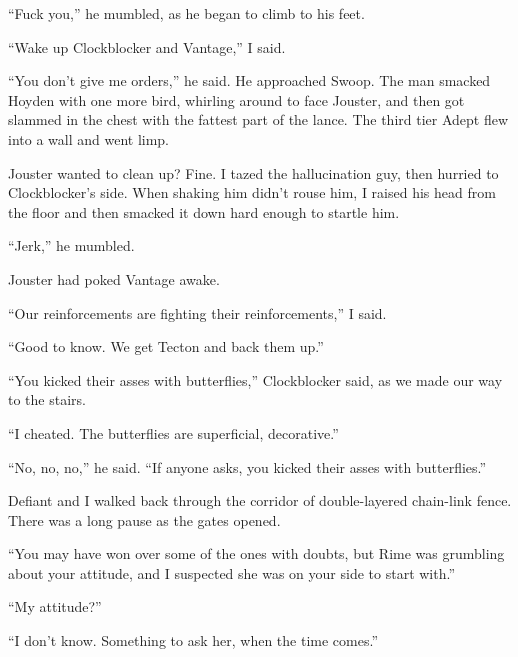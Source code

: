 ``Fuck you,'' he mumbled, as he began to climb to his feet.



``Wake up Clockblocker and Vantage,'' I said.



``You don't give me orders,'' he said.  He approached Swoop.  The man smacked Hoyden with one more bird, whirling around to face Jouster, and then got slammed in the chest with the fattest part of the lance.  The third tier Adept flew into a wall and went limp.



Jouster wanted to clean up?  Fine.  I tazed the hallucination guy, then hurried to Clockblocker's side.  When shaking him didn't rouse him, I raised his head from the floor and then smacked it down hard enough to startle him.



``Jerk,'' he mumbled.



Jouster had poked Vantage awake.



``Our reinforcements are fighting their reinforcements,'' I said.



``Good to know.  We get Tecton and back them up.''



``You kicked their asses with butterflies,'' Clockblocker said, as we made our way to the stairs.



``I cheated.  The butterflies are superficial, decorative.''



``No, no, no,'' he said.  ``If anyone asks, you kicked their asses with butterflies.''



\sectionbreak



Defiant and I walked back through the corridor of double-layered chain-link fence.  There was a long pause as the gates opened.



``You may have won over some of the ones with doubts, but Rime was grumbling about your attitude, and I suspected she was on your side to start with.''



``My attitude?''



``I don't know.  Something to ask her, when the time comes.''



